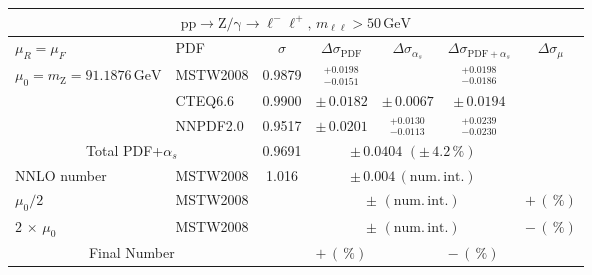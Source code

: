 \begin{table}[htb]
  \begin{center}
    \begin{tabular}{|l|l|c|c|c|c|c|}
      \hline
      
      \multicolumn{7}{|c|}{$\mathrm{pp}\to\mathrm{Z/\gamma}\to{\ell^-\ell^+},\,m_{\ell\ell}>50\,\mathrm{GeV}$}\\ \hline
      $\mu_R=\mu_F$ & PDF & $\sigma$ & $\Delta\sigma_{\mathrm{PDF}}$ & $\Delta\sigma_{\alpha_s}$ & $\Delta\sigma_{\mathrm{PDF}+\alpha_s}$ & $\Delta\sigma_{\mu}$ \\ \hline\hline

      $\mu_0=m_\mathrm{Z}=91.1876\,\mathrm{GeV}$ & MSTW2008 & 0.9879 & $^{+0.0198}_{-0.0151}$ &     &  $^{+0.0198}_{-0.0186}$    &     \\
                                                & CTEQ6.6  & 0.9900 & $\pm\,0.0182$ &  $\pm\,0.0067$  &  $\pm\,0.0194$       &     \\
                                                & NNPDF2.0 & 0.9517 & $\pm\,0.0201$ &  $^{+0.0130}_{-0.0113}$  & $^{+0.0239}_{-0.0230}$     &     \\ \hline\hline
      \multicolumn{2}{|c|}{Total PDF+$\alpha_s$}      &  0.9691    & \multicolumn{3}{c|}{$\pm\,0.0404\,\,(\pm\,4.2\,\%)$} & \\ \hline\hline
      NNLO number                               & MSTW2008 & 1.016 & \multicolumn{3}{c|}{$\pm\,0.004\,(\mathrm{num.\,int.})$} & \\
      $\mu_0/2$                                 & MSTW2008 &  & \multicolumn{3}{c|}{$\pm\,\,(\mathrm{num.\,int.})$} & $+\,(\,\%)$\\
      $2\,\times\,\mu_0$                        & MSTW2008 &  & \multicolumn{3}{c|}{$\pm\,\,(\mathrm{num.\,int.})$} & $-\,(\,\%)$\\ \hline\hline
      \multicolumn{2}{|c|}{Final Number} &  & \multicolumn{2}{l}{$+\,(\,\%)$} & \multicolumn{2}{l|}{$-\,(\,\%)$} \\



\hline 
\end{tabular}
\end{center}
\end{table} 


